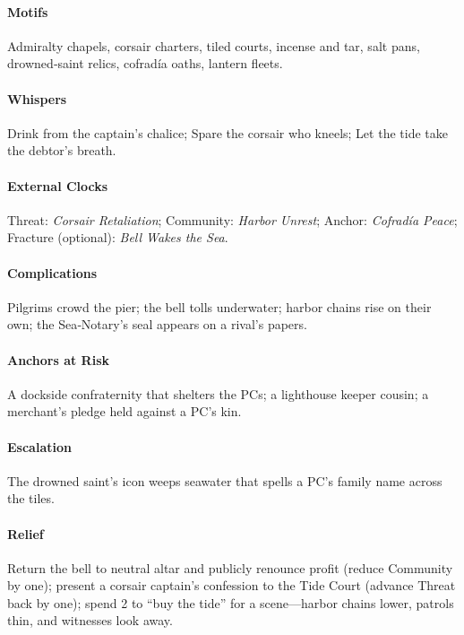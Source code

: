 \paragraph{Motifs} Admiralty chapels, corsair charters, tiled courts, incense and tar, salt pans, drowned‑saint relics, cofradía oaths, lantern fleets.
\paragraph{Whispers} Drink from the captain’s chalice; Spare the corsair who kneels; Let the tide take the debtor’s breath.
\paragraph{External Clocks} Threat: \emph{Corsair Retaliation}; Community: \emph{Harbor Unrest}; Anchor: \emph{Cofradía Peace}; Fracture (optional): \emph{Bell Wakes the Sea}.
\paragraph{Complications} Pilgrims crowd the pier; the bell tolls underwater; harbor chains rise on their own; the Sea‑Notary’s seal appears on a rival’s papers.
\paragraph{Anchors at Risk} A dockside confraternity that shelters the PCs; a lighthouse keeper cousin; a merchant’s pledge held against a PC’s kin.
\paragraph{Escalation} The drowned saint’s icon weeps seawater that spells a PC’s family name across the tiles.
\paragraph{Relief} Return the bell to neutral altar and publicly renounce profit (reduce Community by one); present a corsair captain’s confession to the Tide Court (advance Threat back by one); spend 2 \Boons{} to “buy the tide” for a scene—harbor chains lower, patrols thin, and witnesses look away.

